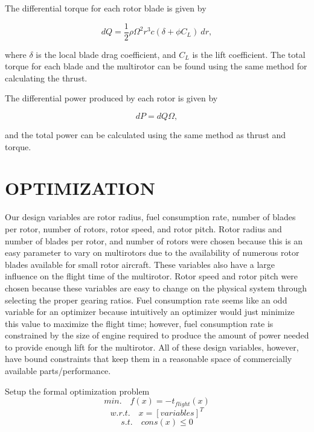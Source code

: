 \documentclass[letterpaper, 10 pt, conference]{ieeeconf}  %
\newcommand{\of}[1]{\ensuremath{\left(#1\right)}}
\begin{document}
The differential torque for each rotor blade is given by

\begin{equation}
	dQ = \frac{1}{2} \rho \Omega^2 r^3 c (\delta + \phi C_L) \ dr,
	\label{torque_eqn}
\end{equation}

where $\delta$ is the local blade drag coefficient, and $C_L$ is the lift coefficient. The total torque for each blade and the multirotor can be found using the same method for calculating the thrust. 

The differential power produced by each rotor is given by 

\begin{equation}
	dP = dQ\Omega,
\end{equation}

and the total power can be calculated using the same method as thrust and torque. 


\section{OPTIMIZATION}

Our design variables are rotor radius, fuel consumption rate, number of blades per rotor, number of rotors, rotor speed, and rotor pitch. Rotor radius and number of blades per rotor, and number of rotors were chosen because this is an easy parameter to vary on multirotors due to the availability of numerous rotor blades available for small rotor aircraft. These variables also have a large influence on the flight time of the multirotor. Rotor speed and rotor pitch were chosen because these variables are easy to change on the physical system through selecting the proper gearing ratios. Fuel consumption rate seems like an odd variable for an optimizer because intuitively an optimizer would just minimize this value to maximize the flight time; however, fuel consumption rate is constrained by the size of engine required to produce the amount of power needed to provide enough lift for the multirotor. All of these design variables, however, have bound constraints that keep them in a reasonable space of commercially available parts/performance.

Setup the formal optimization problem
\begin{equation}
min. \quad f\of{x} = -t_{flight}\of{x}
\label{eq:objective}
\end{equation}
\begin{equation}
w.r.t. \quad x = [variables]^T
\label{eq:vars}
\end{equation}
\begin{equation}
s.t. \quad cons\of{x} \leq 0 
\label{eq:constrants}
\end{equation}
\end{document}
